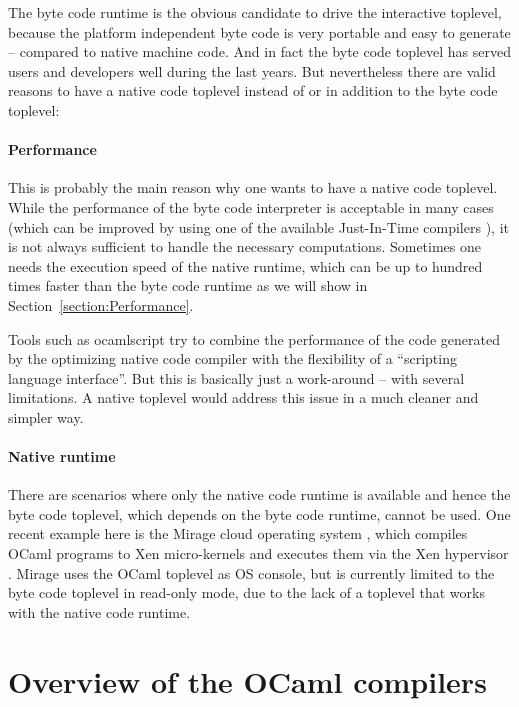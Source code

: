 \documentclass[10pt,a4paper,draft,twocolumn]{article}
\begin{document}
The byte code runtime is the obvious candidate to drive the interactive toplevel, because the platform
independent byte code is very portable and easy to generate -- compared to native machine code. And in
fact the byte code toplevel has served users and developers well during the last years. But nevertheless
there are valid reasons to have a native code toplevel instead of or in addition to the byte code toplevel:

\paragraph{Performance}

This is probably the main reason why one wants to have a native code toplevel. While the performance of
the byte code interpreter is acceptable in many cases (which can be improved by using one of the
available Just-In-Time compilers \cite{Meurer10ocamljit,Meurer10jit,Meurer11ocamljit2,Starynkevitch04}),
it is not always sufficient to handle the necessary computations. Sometimes one needs the execution
speed of the native runtime, which can be up to hundred times faster than the byte code runtime as we will
show in Section~\ref{section:Performance}.

Tools such as ocamlscript \cite{ocamlscript11} try to combine the performance of the code generated by
the optimizing native code compiler with the flexibility of a ``scripting language interface''. But this
is basically just a work-around -- with several limitations. A native toplevel would address this issue in
a much cleaner and simpler way.

\paragraph{Native runtime}

There are scenarios where only the native code runtime is available and hence the byte code toplevel,
which depends on the byte code runtime, cannot be used. One recent example here is the Mirage cloud
operating system \cite{Mirage11,Madhavapeddy10,Madhavapeddy10hotcloud}, which compiles OCaml programs
to Xen micro-kernels \cite{Barham03} and executes them via the Xen hypervisor \cite{Xen11}. Mirage
uses the OCaml toplevel as OS console, but is currently limited to the byte code toplevel in read-only
mode, due to the lack of a toplevel that works with the native code runtime.


\section{Overview of the OCaml compilers} \label{section:Overview_of_the_OCaml_compilers}
\end{document}
